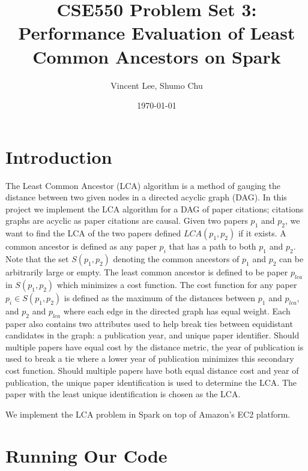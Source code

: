 \documentclass{article}
\begin{document}
\title{CSE550 Problem Set 3: Performance Evaluation of Least Common Ancestors on Spark}
\author{Vincent Lee, Shumo Chu}
\date{\today}

\maketitle

\tableofcontents


\section{Introduction}

The Least Common Ancestor (LCA) algorithm is a method of gauging the distance between two given nodes in a directed acyclic graph (DAG).
In this project we implement the LCA algorithm for a DAG of paper citations; citations graphs are acyclic as paper citations are causal.
Given two papers $p_1$ and $p_2$, we want to find the LCA of the two papers defined $LCA(p_1, p_2)$ if it exists.
A common ancestor is defined as any paper $p_i$ that has a path to both $p_1$ and $p_2$.
Note that the set $S(p_1, p_2)$ denoting the common ancestors of $p_1$ and $p_2$ can be arbitrarily large or empty.
The least common ancestor is defined to be paper $p_{lca}$ in $S(p_1, p_2)$ which minimizes a cost function.
The cost function for any paper $p_i \in S(p_1, p_2)$ is defined as the maximum of the distances between $p_1$ and $p_{lca}$, and $p_2$ and $p_{lca}$ where each edge in the directed graph has equal weight.
Each paper also contains two attributes used to help break ties between equidistant candidates in the graph: a publication year, and unique paper identifier.
Should multiple papers have equal cost by the distance metric, the year of publication is used to break a tie where a lower year of publication minimizes this secondary cost function.
Should multiple papers have both equal distance cost and year of publication, the unique paper identification is used to determine the LCA.
The paper with the least unique identification is chosen as the LCA.

We implement the LCA problem in Spark on top of Amazon's EC2 platform.

\section{Running Our Code}
\end{document}
